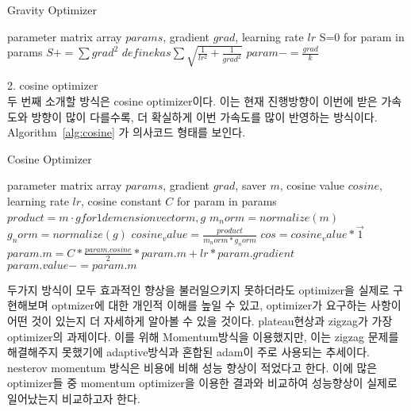 \documentclass{article}
\begin{document}
\begin{algorithm}[tb]
   \caption{Gravity Optimizer}
   \label{alg:gravity}
\begin{algorithmic}
    parameter matrix array $params$, gradient $grad$, learning rate $lr$
   \STATE S=0
   \REPEAT
   \STATE for param in params
   \STATE $ S += \sum{grad^2}$
   \ENDFOR
   \STATE $define k as \sum{\sqrt{\frac{1}{lr^2}+\frac{1}{grad^2}}}$
   \STATE $param-=\frac{grad}{k}$
   \ENDFOR
\end{algorithmic}
\end{algorithm}

2. cosine optimizer\\
두 번째 소개할 방식은 cosine optimizer이다. 이는 현재 진행방향이 이번에 받은 가속도와 방향이 많이 다를수록, 더 확실하게 이번 가속도를 많이 반영하는 방식이다. Algorithm~\ref{alg:cosine} 가 의사코드 형태를 보인다.

\begin{algorithm}[tb]
   \caption{Cosine Optimizer}
   \label{alg:cosine}
\begin{algorithmic}
    parameter matrix array $params$, gradient $grad$, saver $m$, cosine value $cosine$, learning rate $lr$, cosine constant $C$
   \REPEAT
   \STATE for param in params
   \STATE $product=m\cdot g for 1 demension vector m, g$
   \STATE $m_norm=normalize(m)$
   \STATE $g_norm=normalize(g)$
   \STATE $cosine_value=\frac{product}{m_norm*g_norm}$
   \STATE $cos=cosine_value*\vec{1}$
   \ENDFOR
   \STATE $param.m=C*\frac{param.cosine}{2}*param.m+lr*param.gradient$
   \STATE $param.value-=param.m$
   \ENDFOR
\end{algorithmic}
\end{algorithm}


두가지 방식이 모두 효과적인 향상을 불러일으키지 못하더라도 optimizer을 실제로 구현해보며 optmizer에 대한 개인적 이해를 높일 수 있고, optimizer가 요구하는 사항이 어떤 것이 있는지 더 자세하게 알아볼 수 있을 것이다.
plateau현상과 zigzag가 가장 optimizer의 과제이다. 이를 위해 Momentum방식을 이용했지만, 이는 zigzag 문제를 해결해주지 못했기에 adaptive방식과 혼합된 adam이 주로 사용되는 추세이다. nesterov momentum 방식은 비용에 비해 성능 향상이 적었다고 한다. 이에 많은 optimizer들 중 momentum optimizer을 이용한 결과와 비교하여 성능향상이 실제로 일어났는지 비교하고자 한다.
\end{document}
